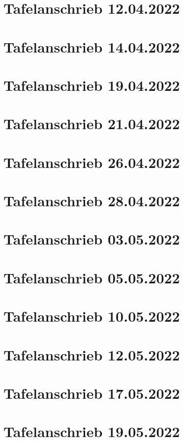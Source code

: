 \documentclass[a4paper,12pt]{article}
\begin{document}
\tableofcontents
\newpage
\section{Tafelanschrieb 12.04.2022}

\newpage
\section{Tafelanschrieb 14.04.2022}

\section{Tafelanschrieb 19.04.2022}

\section{Tafelanschrieb 21.04.2022}

\newpage
\section{Tafelanschrieb 26.04.2022}

\newpage
\section{Tafelanschrieb 28.04.2022}

\newpage
\section{Tafelanschrieb 03.05.2022}

\newpage
\section{Tafelanschrieb 05.05.2022}

\newpage
\section{Tafelanschrieb 10.05.2022}

\newpage
\section{Tafelanschrieb 12.05.2022}

\newpage
\section{Tafelanschrieb 17.05.2022}

\newpage
\section{Tafelanschrieb 19.05.2022}

\newpage
\end{document}
